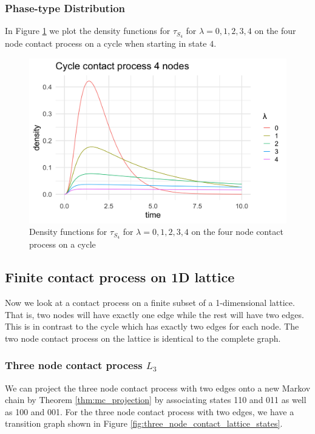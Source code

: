 \subsubsection{Phase-type Distribution}

In Figure \ref{fig:contact_4_cycle_phase_densities} we plot the density functions for $\tau_{S_4}$ for $\lambda = 0, 1, 2, 3, 4$ on the four node contact process on a cycle when starting in state $4$.

\begin{figure}[H]
  \centering
    \includegraphics[width=.80\textwidth]{figures/cycle_4_contact_phase_densities.png}
   \caption{Density functions for $\tau_{S_4}$ for $\lambda = 0, 1, 2, 3, 4$ on the four node contact process on a cycle}
  \label{fig:contact_4_cycle_phase_densities}
\end{figure}

\subsection{Finite contact process on 1D lattice}

Now we look at a contact process on a finite subset of a 1-dimensional lattice.
That is, two nodes will have exactly one edge while the rest will have two edges.
This is in contrast to the cycle which has exactly two edges for each node.
The two node contact process on the lattice is identical to the complete graph.

\subsubsection{Three node contact process \texorpdfstring{$L_3$}{L3}}
We can project the three node contact process with two edges onto a new Markov chain by Theorem \ref{thm:mc_projection} by associating states 110 and 011 as well as 100 and 001.
For the three node contact process with two edges, we have a transition graph shown in Figure \ref{fig:three_node_contact_lattice_states}.

